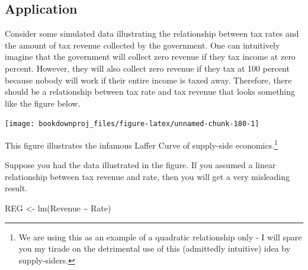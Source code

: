 \documentclass[
]{book}
\newenvironment{Shaded}{\begin{snugshade}}{\end{snugshade}}
\newcommand{\FunctionTok}[1]{\textcolor[rgb]{0.00,0.00,0.00}{#1}}
\newcommand{\NormalTok}[1]{#1}
\newcommand{\OtherTok}[1]{\textcolor[rgb]{0.56,0.35,0.01}{#1}}
\newcommand{\SpecialCharTok}[1]{\textcolor[rgb]{0.00,0.00,0.00}{#1}}
\begin{document}
\hypertarget{application-5}{%
\subsection*{Application}\label{application-5}}

Consider some simulated data illustrating the relationship between tax rates and the amount of tax revenue collected by the government. One can intuitively imagine that the government will collect zero revenue if they tax income at zero percent. However, they will also collect zero revenue if they tax at 100 percent because nobody will work if their entire income is taxed away. Therefore, there should be a relationship between tax rate and tax revenue that looks something like the figure below.

\begin{center}\texttt{[image: bookdownproj\_files/figure-latex/unnamed-chunk-180-1]} \end{center}

This figure illustrates the infamous Laffer Curve of supply-side economics.\footnote{We are using this as an example of a quadratic relationship only - I will spare you my tirade on the detrimental use of this (admittedly intuitive) idea by supply-siders.}

Suppose you had the data illustrated in the figure. If you assumed a linear relationship between tax revenue and rate, then you will get a very misleading result.

\begin{Shaded}
\begin{Highlighting}[]
\NormalTok{REG }\OtherTok{\textless{}{-}} \FunctionTok{lm}\NormalTok{(Revenue }\SpecialCharTok{\textasciitilde{}}\NormalTok{ Rate)}
\end{Highlighting}
\end{Shaded}
\end{document}
